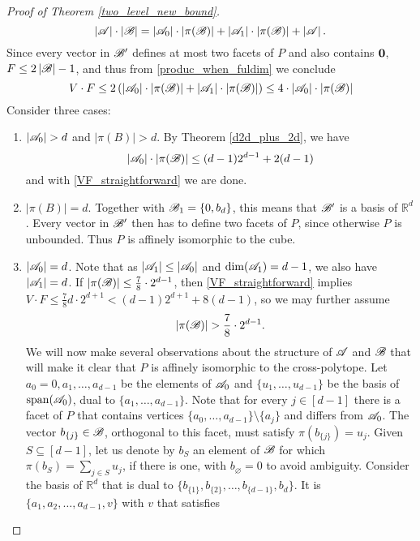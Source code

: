 \begin{proof}[Proof of Theorem \ref{two_level_new_bound}]
    \begin{equation}\label{produc_when_fuldim}
        \left|{\mathscr{A}}\right|\cdot\left|{\mathscr{B}}\right|=\left|{\mathscr{A}}_0\right|\cdot\left|\pi({\mathscr{B}})\right|+\left|{\mathscr{A}}_1\right|\cdot\left|\pi({\mathscr{B}})\right|+\left|{\mathscr{A}}\right|.
    \end{equation}
    Since every vector in ${\mathscr{B}}'$ defines at most two facets of $P$ and also contains $\mathbf{0}$, $F\le 2\left|{\mathscr{B}}\right| -1$, and thus from \eqref{produc_when_fuldim} we conclude
    \begin{equation}\label{VF_straightforward}
        V\cdot F \leq 2 \left(\left|{\mathscr{A}}_0\right|\cdot\left|\pi({\mathscr{B}})\right|+\left|{\mathscr{A}}_1\right|\cdot\left|\pi({\mathscr{B}})\right|\right) \leq 4\cdot\left|{\mathscr{A}}_0\right|\cdot\left|\pi({\mathscr{B}})\right|
    \end{equation}
    Consider three cases:
    \begin{enumerate}
        \item $\left|{\mathscr{A}}_0\right| > d$ and $\left|\pi(B)\right| > d$. By Theorem \ref{d2d_plus_2d}, we have
        \[\left|{\mathscr{A}}_0\right|\cdot\left|\pi({\mathscr{B}})\right| \leq (d-1)2^{d-1}+2(d-1)\]
        and with \eqref{VF_straightforward} we are done. 
        \item $\left|\pi(B)\right| = d$. Together with ${\mathscr{B}}_1=\{0,b_d\}$, this means that ${\mathscr{B}}'$ is a basis of $\mathbb{R}^d$. Every vector in ${\mathscr{B}}'$ then has to define two facets of $P$, since otherwise $P$ is unbounded. Thus $P$ is affinely isomorphic to the cube.
        \item $\left|{\mathscr{A}}_0\right| = d$. Note that as $|{\mathscr{A}}_1| \leq |{\mathscr{A}}_0|$ and $\operatorname{dim}({\mathscr{A}}_1)=d-1$, we also have $\left|{\mathscr{A}}_1\right|=d$. If $|\pi({\mathscr{B}})|\leq \frac{7}{8} \cdot 2^{d-1}$, then \eqref{VF_straightforward} implies $V \cdot F \leq \frac{7}{8} d \cdot 2^{d+1} < (d-1)2^{d+1} + 8(d-1)$, so we may further assume
        \begin{equation}\label{piBisLarge}
            |\pi({\mathscr{B}})| > \frac{7}{8} \cdot 2^{d-1}.
        \end{equation}
        We will now make several observations about the structure of ${\mathscr{A}}$ and ${\mathscr{B}}$ that will make it clear that $P$ is affinely isomorphic to the cross-polytope. Let $a_0=0, a_1, \ldots, a_{d-1}$ be the elements of ${\mathscr{A}}_0$ and $\{u_{1}, \ldots, u_{d-1}\}$ be the basis of $\operatorname{span}({\mathscr{A}}_0)$, dual to $\{a_1, \ldots, a_{d-1}\}$. Note that for every $j\in [d-1]$ there is a facet of $P$ that contains vertices $\{a_0, \ldots, a_{d-1}\}\setminus \{a_j\}$ and differs from ${\mathscr{A}}_0$. The vector $b_{\{j\}}\in {\mathscr{B}}$, orthogonal to this facet, must satisfy $\pi(b_{\{j\}})=u_j$. Given $S\subseteq [d-1]$, let us denote by $b_{S}$ an element of ${\mathscr{B}}$ for which $\pi(b_S)=\sum_{j\in S}u_j$, if there is one, with $b_{\varnothing}=0$ to avoid ambiguity. Consider the basis of $\mathbb{R}^d$ that is dual to $\{b_{\{1\}}, b_{\{2\}}, \ldots, b_{\{d-1\}}, b_d\}$. It is $\{a_1, a_2, \ldots, a_{d-1}, v\}$ with $v$ that satisfies 

\end{enumerate}
\end{proof}
